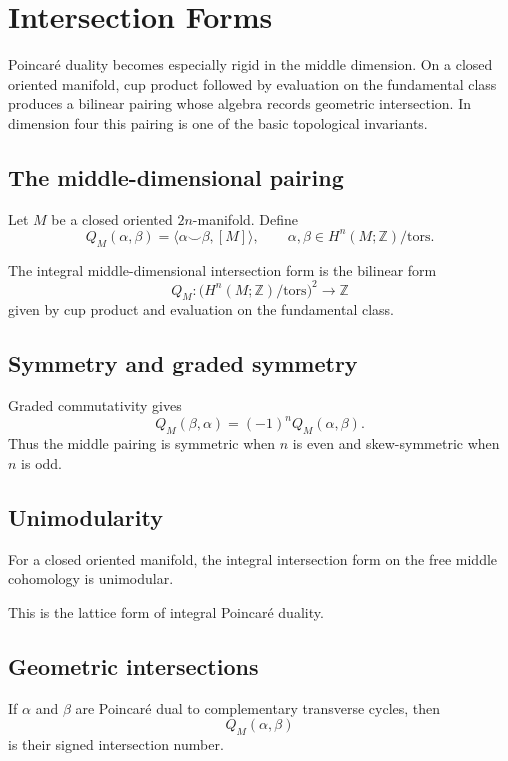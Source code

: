 
\chapter{Intersection Forms}
\label{ch:viii34-intersection-forms}

Poincaré duality becomes especially rigid in the middle dimension.  On a
closed oriented manifold, cup product followed by evaluation on the
fundamental class produces a bilinear pairing whose algebra records geometric
intersection.  In dimension four this pairing is one of the basic topological
invariants.

\section{The middle-dimensional pairing}
Let $M$ be a closed oriented $2n$-manifold.  Define
\[
Q_M(\alpha,\beta)
=
\langle \alpha\smile\beta,[M]\rangle,
\qquad
\alpha,\beta\in H^n(M;\mathbb Z)/\mathrm{tors}.
\]

\begin{definition}
\label{def:viii34-intersection-form}
The integral middle-dimensional intersection form is the bilinear form
\[
Q_M:
\bigl(H^n(M;\mathbb Z)/\mathrm{tors}\bigr)^2\longrightarrow\mathbb Z
\]
given by cup product and evaluation on the fundamental class.
\end{definition}

\section{Symmetry and graded symmetry}
Graded commutativity gives
\[
Q_M(\beta,\alpha)=(-1)^nQ_M(\alpha,\beta).
\]
Thus the middle pairing is symmetric when $n$ is even and skew-symmetric when
$n$ is odd.

\section{Unimodularity}
\begin{theorem}[Unimodularity]
\label{thm:viii34-unimodular}
For a closed oriented manifold, the integral intersection form on the free
middle cohomology is unimodular.
\end{theorem}
This is the lattice form of integral Poincaré duality.

\section{Geometric intersections}
If $\alpha$ and $\beta$ are Poincaré dual to complementary transverse cycles,
then
\[
Q_M(\alpha,\beta)
\]
is their signed intersection number.

